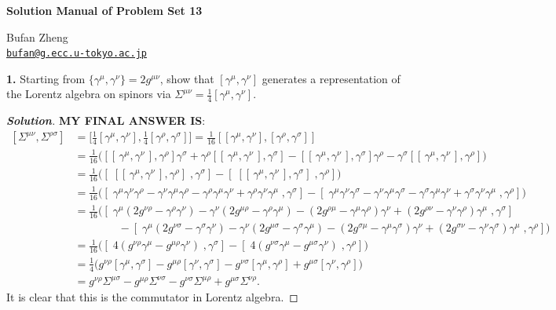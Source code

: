 \documentclass[11pt]{article}
\newenvironment{solution}[1][]{\begin{proof}[\textbf{Solution}]}{\end{proof}}
\begin{document}
\begin{center}
    {\LARGE \textbf{Solution Manual of Problem Set 13} \par}
    \vspace{1em}
    {\large Bufan Zheng\\ \href{mailto:bufan@g.ecc.u-tokyo.ac.jp}{\texttt{bufan@g.ecc.u-tokyo.ac.jp}} \par}
\end{center}


\begin{tcolorbox}[problem]
\textbf{1.} Starting from $\{\gamma^\mu,\gamma^\nu\}=2g^{\mu\nu}$, show that $[\gamma^\mu,\gamma^\nu]$ generates a representation of the Lorentz algebra on spinors via $\Sigma^{\mu\nu}=\frac14[\gamma^\mu,\gamma^\nu]$.
\end{tcolorbox}
\begin{solution}[13.1]
	\textbf{MY FINAL ANSWER IS}:
$$
\begin{aligned}
	[\Sigma^{\mu\nu},\Sigma^{\rho\sigma}]
	&=\Big[\tfrac14[\gamma^\mu,\gamma^\nu],\tfrac14[\gamma^\rho,\gamma^\sigma]\Big]
	=\tfrac1{16}[[\gamma^\mu,\gamma^\nu],[\gamma^\rho,\gamma^\sigma]]\\
	&=\tfrac1{16}\Big([[\,\gamma^\mu,\gamma^\nu\,],\gamma^\rho]\gamma^\sigma+\gamma^\rho[[\,\gamma^\mu,\gamma^\nu\,],\gamma^\sigma]-[[\,\gamma^\mu,\gamma^\nu\,],\gamma^\sigma]\gamma^\rho-\gamma^\sigma[[\,\gamma^\mu,\gamma^\nu\,],\gamma^\rho]\Big)\\
	&=\tfrac1{16}\Big([\;[[\,\gamma^\mu,\gamma^\nu\,],\gamma^\rho]\;,\gamma^\sigma]-[\;[[\,\gamma^\mu,\gamma^\nu\,],\gamma^\sigma]\;,\gamma^\rho]\Big)\\
	&=\tfrac1{16}\Big([\;\gamma^\mu\gamma^\nu\gamma^\rho-\gamma^\nu\gamma^\mu\gamma^\rho-\gamma^\rho\gamma^\mu\gamma^\nu+\gamma^\rho\gamma^\nu\gamma^\mu\;,\gamma^\sigma]-[\;\gamma^\mu\gamma^\nu\gamma^\sigma-\gamma^\nu\gamma^\mu\gamma^\sigma-\gamma^\sigma\gamma^\mu\gamma^\nu+\gamma^\sigma\gamma^\nu\gamma^\mu\;,\gamma^\rho]\Big)\\
	&=\tfrac1{16}\Big([\;\gamma^\mu(2g^{\nu\rho}-\gamma^\rho\gamma^\nu)-\gamma^\nu(2g^{\mu\rho}-\gamma^\rho\gamma^\mu)-(2g^{\rho\mu}-\gamma^\mu\gamma^\rho)\gamma^\nu+(2g^{\rho\nu}-\gamma^\nu\gamma^\rho)\gamma^\mu\;,\gamma^\sigma]\\
	&\qquad\qquad-[\;\gamma^\mu(2g^{\nu\sigma}-\gamma^\sigma\gamma^\nu)-\gamma^\nu(2g^{\mu\sigma}-\gamma^\sigma\gamma^\mu)-(2g^{\sigma\mu}-\gamma^\mu\gamma^\sigma)\gamma^\nu+(2g^{\sigma\nu}-\gamma^\nu\gamma^\sigma)\gamma^\mu\;,\gamma^\rho]\Big)\\
	&=\tfrac1{16}\Big([\;4(g^{\nu\rho}\gamma^\mu-g^{\mu\rho}\gamma^\nu)\;,\gamma^\sigma]-[\;4(g^{\nu\sigma}\gamma^\mu-g^{\mu\sigma}\gamma^\nu)\;,\gamma^\rho]\Big)\\
	&=\tfrac14\Big(g^{\nu\rho}[\gamma^\mu,\gamma^\sigma]-g^{\mu\rho}[\gamma^\nu,\gamma^\sigma]-g^{\nu\sigma}[\gamma^\mu,\gamma^\rho]+g^{\mu\sigma}[\gamma^\nu,\gamma^\rho]\Big)\\
	&=g^{\nu\rho}\Sigma^{\mu\sigma}-g^{\mu\rho}\Sigma^{\nu\sigma}-g^{\nu\sigma}\Sigma^{\mu\rho}+g^{\mu\sigma}\Sigma^{\nu\rho}.
\end{aligned}
$$
It is clear that this is the commutator in Lorentz algebra.
\end{solution}
\end{document}
